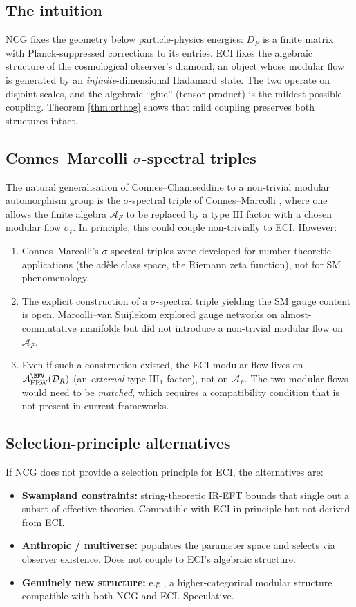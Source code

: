 \documentclass[11pt,a4paper]{article}
\theoremstyle{definition}
\newcommand{\cA}{\mathcal{A}}
\newcommand{\cD}{\mathcal{D}}
\newcommand{\FRW}{\mathrm{FRW}}
\begin{document}
\subsection{The intuition}
NCG fixes the geometry below particle-physics energies: $D_F$ is a
finite matrix with Planck-suppressed corrections to its entries.
ECI fixes the algebraic structure of the cosmological observer's
diamond, an object whose modular flow is generated by an
\emph{infinite}-dimensional Hadamard state. The two operate on
disjoint scales, and the algebraic ``glue'' (tensor product) is the
mildest possible coupling. Theorem \ref{thm:orthog} shows that mild
coupling preserves both structures intact.

\subsection{Connes--Marcolli $\sigma$-spectral triples}
The natural generalisation of Connes--Chamseddine to a non-trivial
modular automorphism group is the $\sigma$-spectral triple of
Connes--Marcolli \cite[\S 4]{ConnesMarcolli08}, where one allows the
finite algebra $\cA_F$ to be replaced by a type $\mathrm{III}$ factor
with a chosen modular flow $\sigma_t$. In principle, this could couple
non-trivially to ECI. However:
\begin{enumerate}\setlength\itemsep{2pt}
\item Connes--Marcolli's $\sigma$-spectral triples were developed for
number-theoretic applications (the adèle class space, the Riemann
zeta function), not for SM phenomenology.
\item The explicit construction of a $\sigma$-spectral triple yielding
the SM gauge content is open. Marcolli--van Suijlekom \cite{MvS13}
explored gauge networks on almost-commutative manifolds but did not
introduce a non-trivial modular flow on $\cA_F$.
\item Even if such a construction existed, the ECI modular flow lives
on $\cA_\FRW^\BFV(\cD_R)$ (an \emph{external} type $\mathrm{III}_1$
factor), not on $\cA_F$. The two modular flows would need to be
\emph{matched}, which requires a compatibility condition that is not
present in current frameworks.
\end{enumerate}

\subsection{Selection-principle alternatives}
If NCG does not provide a selection principle for ECI, the alternatives
are:
\begin{itemize}\setlength\itemsep{2pt}
\item \textbf{Swampland constraints:} string-theoretic IR-EFT bounds
that single out a subset of effective theories. Compatible with ECI
in principle but not derived from ECI.
\item \textbf{Anthropic / multiverse:} populates the parameter space and
selects via observer existence. Does not couple to ECI's algebraic
structure.
\item \textbf{Genuinely new structure:} e.g., a higher-categorical
modular structure compatible with both NCG and ECI. Speculative.
\end{itemize}
\end{document}
